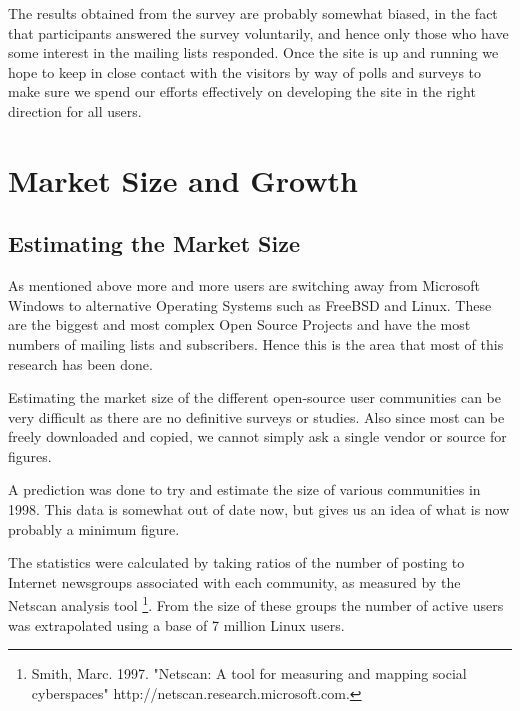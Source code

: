 The results obtained from the survey are probably somewhat biased, in the fact that participants answered the survey voluntarily, and hence only those who have some interest in the mailing lists responded.  Once the site is up and running we hope to keep in close contact with the visitors by way of polls and surveys to make sure we spend our efforts effectively on developing the site in the right direction for all users.


\section{Market Size and Growth}
\subsection{Estimating the Market Size}
\label{sec:size}
As mentioned above more and more users are switching away from Microsoft Windows to alternative Operating Systems such as FreeBSD and Linux.  These are the biggest and most complex Open Source Projects and have the most numbers of mailing lists and subscribers.  Hence this is the area that most of this research has been done.

Estimating the market size of the different open-source user communities can be very difficult as there are no definitive surveys or studies.  Also since most can be freely downloaded and copied, we cannot simply ask a single vendor or source for figures.

A prediction was done to try and estimate the size of various communities in 1998.  This data is somewhat out of date now, but gives us an idea of what is now probably a minimum figure.  

The statistics were calculated by taking ratios of the number of posting to Internet newsgroups associated with each community, as measured by the Netscan analysis tool \footnote{Smith, Marc. 1997. "Netscan: A tool for measuring and mapping social cyberspaces" http://netscan.research.microsoft.com.}.  From the size of these groups the number of active users was extrapolated using a base of 7 million Linux users.


\begin{figure}[!ht]
\begin{center}
\end{center}
\end{figure}

